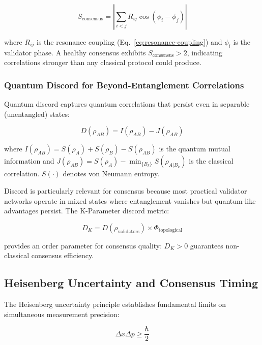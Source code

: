 \documentclass[11pt,a4paper]{article}
\begin{document}
\begin{equation}
S_{\text{consensus}} = \left|\sum_{i<j} R_{ij} \cos(\phi_i - \phi_j)\right|
\end{equation}

where $R_{ij}$ is the resonance coupling (Eq.~\ref{eq:resonance-coupling}) and $\phi_i$ is the validator phase. A healthy consensus exhibits $S_{\text{consensus}} > 2$, indicating correlations stronger than any classical protocol could produce.

\subsubsection{Quantum Discord for Beyond-Entanglement Correlations}

Quantum discord \cite{ollivier2001} captures quantum correlations that persist even in separable (unentangled) states:

\begin{equation}
D(\rho_{AB}) = I(\rho_{AB}) - J(\rho_{AB})
\label{eq:quantum-discord}
\end{equation}

where $I(\rho_{AB}) = S(\rho_A) + S(\rho_B) - S(\rho_{AB})$ is the quantum mutual information and $J(\rho_{AB}) = S(\rho_A) - \min_{\{B_k\}} S(\rho_{A|B_k})$ is the classical correlation. $S(\cdot)$ denotes von Neumann entropy.

Discord is particularly relevant for consensus because most practical validator networks operate in mixed states where entanglement vanishes but quantum-like advantages persist. The K-Parameter discord metric:

\begin{equation}
D_K = D(\rho_{\text{validators}}) \times \Phi_{\text{topological}}
\end{equation}

provides an order parameter for consensus quality: $D_K > 0$ guarantees non-classical consensus efficiency.

\subsection{Heisenberg Uncertainty and Consensus Timing}

The Heisenberg uncertainty principle establishes fundamental limits on simultaneous measurement precision:

\begin{equation}
\Delta x \Delta p \geq \frac{\hbar}{2}
\label{eq:heisenberg-uncertainty}
\end{equation}
\end{document}
